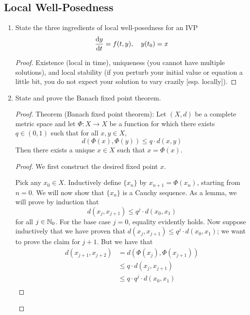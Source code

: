 \documentclass[../psets.tex]{subfiles}
\begin{document}
\subsection*{Local Well-Posedness}
\begin{enumerate}
    \item State the three ingredients of local well-posedness for an IVP
    \begin{equation*}
        \dv{y}{t} = f(t,y)
        ,\quad
        y(t_0) = x
    \end{equation*}
    \begin{proof}
        Existence (local in time), uniqueness (you cannot have multiple solutions), and local stability (if you perturb your initial value or equation a little bit, you do not expect your solution to vary crazily [esp. locally]).
    \end{proof}
    \item State and prove the Banach fixed point theorem.
    \begin{proof}
        Theorem (Banach fixed point theorem): Let $(X,d)$ be a complete metric space and let $\Phi:X\to X$ be a function for which there exists $q\in(0,1)$ such that for all $x,y\in X$,
        \begin{equation*}
            d(\Phi(x),\Phi(y)) \leq q\cdot d(x,y)
        \end{equation*}
        Then there exists a unique $x\in X$ such that $x=\Phi(x)$.
        \begin{proof}
            We first construct the desired fixed point $x$.\par
            Pick any $x_0\in X$. Inductively define $\{x_n\}$ by $x_{n+1}=\Phi(x_n)$, starting from $n=0$. We will now show that $\{x_n\}$ is a Cauchy sequence. As a lemma, we will prove by induction that
            \begin{equation*}
                d(x_j,x_{j+1}) \leq q^j\cdot d(x_0,x_1)
            \end{equation*}
            for all $j\in\mathbb{N}_0$. For the base case $j=0$, equality evidently holds. Now suppose inductively that we have proven that $d(x_j,x_{j+1})\leq q^j\cdot d(x_0,x_1)$; we want to prove the claim for $j+1$. But we have that
            \begin{align*}
                d(x_{j+1},x_{j+2}) &= d(\Phi(x_j),\Phi(x_{j+1}))\\
                &\leq q\cdot d(x_j,x_{j+1})\\
                &\leq q\cdot q^j\cdot d(x_0,x_1)\\

\end{align*}
\end{proof}
\end{proof}
\end{enumerate}
\end{document}
